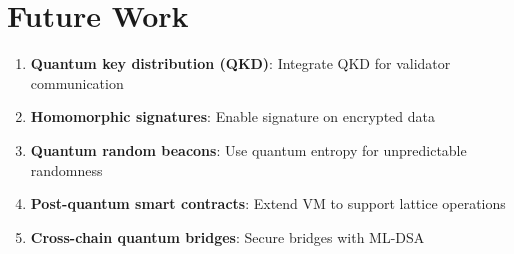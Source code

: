 \section{Future Work}


\begin{enumerate}
    \item \textbf{Quantum key distribution (QKD)}: Integrate QKD for validator communication
    \item \textbf{Homomorphic signatures}: Enable signature on encrypted data
    \item \textbf{Quantum random beacons}: Use quantum entropy for unpredictable randomness
    \item \textbf{Post-quantum smart contracts}: Extend VM to support lattice operations
    \item \textbf{Cross-chain quantum bridges}: Secure bridges with ML-DSA
\end{enumerate}

